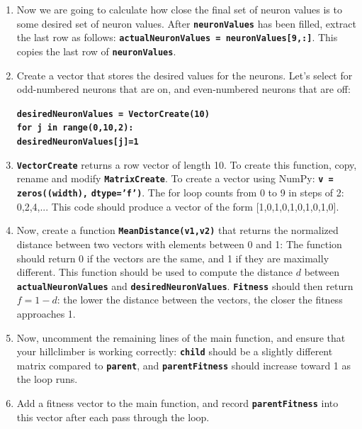 \documentclass[12pt]{article}
\begin{document}
\begin{enumerate}
\item Now we are going to calculate how close the final set of neuron values is to some desired set of neuron values. After \textbf{\texttt{neuronValues}} has been filled, extract the last row as follows: \textbf{\texttt{actualNeuronValues = neuronValues[9,:]}}. This copies the last row of \textbf{\texttt{neuronValues}}.

\item Create a vector that stores the desired values for the neurons. Let's select for odd-numbered neurons that are on, and even-numbered neurons that are off:

\textbf{\texttt{desiredNeuronValues = VectorCreate(10)}}\\
\textbf{\texttt{for j in range(0,10,2):}}\\
\indent \textbf{\texttt{\hspace{1cm}desiredNeuronValues[j]=1}}\\

\item \textbf{\texttt{VectorCreate}} returns a row vector of length 10. To create this function, copy, rename and modify \textbf{\texttt{MatrixCreate}}. To create a vector using NumPy: \textbf{\texttt{v = zeros((width),}} \textbf{\texttt{dtype='f')}}. The for loop counts from 0 to 9 in steps of 2: 0,2,4,... This code should produce a vector of the form [1,0,1,0,1,0,1,0,1,0].

\item Now, create a function \textbf{\texttt{MeanDistance(v1,v2)}} that returns the normalized distance between two vectors with elements between 0 and 1: The function should return 0 if the vectors are the same, and 1 if they are maximally different. This function should be used to compute the distance $d$ between \textbf{\texttt{actualNeuronValues}} and \textbf{\texttt{desiredNeuronValues}}. \textbf{\texttt{Fitness}} should then return $f=1-d$: the lower the distance between the vectors, the closer the fitness approaches 1.

\item Now, uncomment the remaining lines of the main function, and ensure that your hillclimber is working correctly: \textbf{\texttt{child}} should be a slightly different matrix compared to \textbf{\texttt{parent}}, and \textbf{\texttt{parentFitness}} should increase toward 1 as the loop runs.

\item Add a fitness vector to the main function, and record \textbf{\texttt{parentFitness}} into this vector after each pass through the loop.


\end{enumerate}
\end{document}
